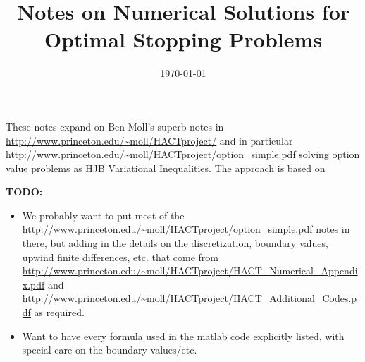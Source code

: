 \documentclass[11pt]{etk-article}
\begin{document}
\title{Notes on Numerical Solutions for Optimal Stopping Problems}
\date{\today}
\maketitle
These notes expand on Ben Moll's superb notes in \url{http://www.princeton.edu/~moll/HACTproject/} and in particular \url{http://www.princeton.edu/~moll/HACTproject/option_simple.pdf} solving option value problems as HJB Variational Inequalities.  The approach is based on \cite{HuangPang1998}

\textbf{TODO:}
\begin{itemize}
	\item We probably want to put most of the \url{http://www.princeton.edu/~moll/HACTproject/option_simple.pdf} notes in there, but adding in the details on the discretization, boundary values, upwind finite differences, etc. that come from \url{http://www.princeton.edu/~moll/HACTproject/HACT_Numerical_Appendix.pdf} and \url{http://www.princeton.edu/~moll/HACTproject/HACT_Additional_Codes.pdf} as required.
	\item Want to have every formula used in the matlab code explicitly listed, with special care on the boundary values/etc.
\end{itemize}


\end{document}
